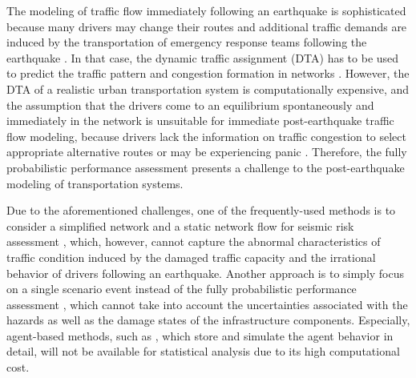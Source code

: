\documentclass[review,11pt,nonatbib]{elsarticle}
\begin{document}
The modeling of traffic flow immediately following an earthquake is sophisticated because many drivers may change their routes and additional traffic demands are induced by the transportation of emergency response teams following the earthquake \citep{ahn2014study}. In that case, the dynamic traffic assignment (DTA) has to be used to predict the traffic pattern and congestion formation in networks \citep{Szeto2011A,Tanimoto2015}. However, the DTA of a realistic urban transportation system is computationally expensive, and the assumption that the drivers come to an equilibrium spontaneously and immediately in the network is unsuitable for immediate post-earthquake traffic flow modeling, because drivers lack the information on traffic congestion to select appropriate alternative routes or may be experiencing panic \citep{pel2011modelling}. Therefore, the fully probabilistic performance assessment presents a challenge to the post-earthquake modeling of transportation systems.
\par Due to the aforementioned challenges, one of the frequently-used methods is to consider a simplified network and a static network flow for seismic risk assessment \citep{Duenas2007Seismic,Miller2015Estimating}, which, however, cannot capture the abnormal characteristics of traffic condition induced by the damaged traffic capacity and the irrational behavior of drivers following an earthquake. Another approach is to simply focus on a single scenario event instead of the fully probabilistic performance assessment  \citep{freckleton2012evaluation,chang2012post,feng2017post}, which cannot take into account the uncertainties associated with the hazards as well as the damage states of the infrastructure components. Especially, agent-based methods, such as \citet{feng2017post}, which store and simulate the agent behavior in detail, will not be available for statistical analysis due to its high computational cost. 
\end{document}
